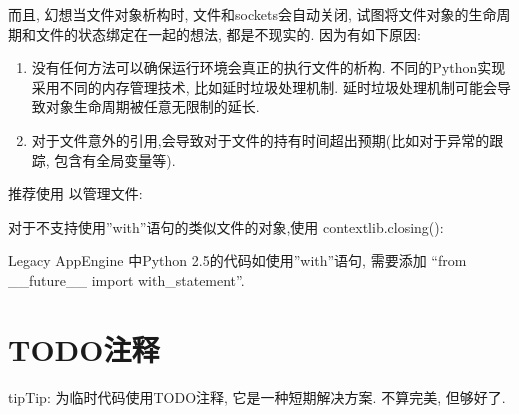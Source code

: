 \documentclass[a4paper,10pt,english]{sphinxmanual}
\begin{document}
而且, 幻想当文件对象析构时, 文件和sockets会自动关闭, 试图将文件对象的生命周期和文件的状态绑定在一起的想法, 都是不现实的. 因为有如下原因:
\begin{enumerate}
\item {} 
没有任何方法可以确保运行环境会真正的执行文件的析构. 不同的Python实现采用不同的内存管理技术, 比如延时垃圾处理机制. 延时垃圾处理机制可能会导致对象生命周期被任意无限制的延长.

\item {} 
对于文件意外的引用,会导致对于文件的持有时间超出预期(比如对于异常的跟踪, 包含有全局变量等).

\end{enumerate}

推荐使用  以管理文件:

%
\begin{sphinxVerbatim}[commandchars=\\\{\}]
   
       
         
\end{sphinxVerbatim}

对于不支持使用”with”语句的类似文件的对象,使用 contextlib.closing():

%
\begin{sphinxVerbatim}[commandchars=\\\{\}]
 

   
       
         
\end{sphinxVerbatim}

Legacy AppEngine 中Python 2.5的代码如使用”with”语句, 需要添加 “from \_\_future\_\_ import with\_statement”.


\section{TODO注释}
\label{\detokenize{python_style_rules:todo}}
\begin{sphinxadmonition}{tip}{Tip:}
为临时代码使用TODO注释, 它是一种短期解决方案. 不算完美, 但够好了.
\end{sphinxadmonition}
\end{document}
